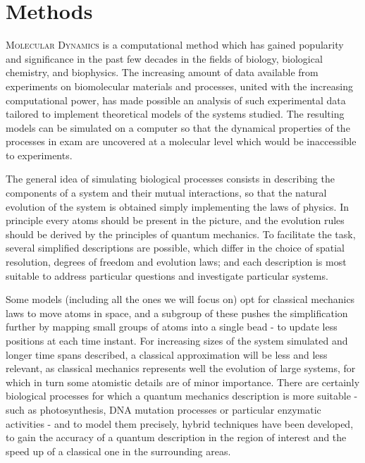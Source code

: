 \chapter{Methods} \label{chapter:MD}

\lettrine{M}{olecular Dynamics} is a computational method which has gained popularity and significance in the past few decades in the fields of biology, biological chemistry, and biophysics.
%
The increasing amount of data available from experiments on biomolecular materials and processes, united with the increasing computational power, has made possible an analysis of such experimental data tailored to implement theoretical models of the systems studied.
%
The resulting models can be simulated on a computer so that the dynamical properties of the processes in exam are uncovered at a molecular level which would be inaccessible to experiments.

The general idea of simulating biological processes consists in describing the components of a system and their mutual interactions, so that the natural evolution of the system is obtained simply implementing the laws of physics. In principle every atoms should be present in the picture, and the evolution rules should be derived by the principles of quantum mechanics.
%
To facilitate the task, several simplified descriptions are possible, which differ in the choice of spatial resolution, degrees of freedom and evolution laws; and each description is most suitable to address particular questions and investigate particular systems.

Some models (including all the ones we will focus on) opt for classical mechanics laws to move atoms in space, and a subgroup of these pushes the simplification further by mapping small groups of atoms into a single bead - to update less positions at each time instant.
%
For increasing sizes of the system simulated and longer time spans described, a classical approximation will be less and less relevant, as classical mechanics represents well the evolution of large systems, for which in turn some atomistic details are of minor importance.
%
There are certainly biological processes for which a quantum mechanics description is more suitable - such as photosynthesis, DNA mutation processes or particular enzymatic activities - and to model them precisely, hybrid techniques have been developed, to gain the accuracy of a quantum description in the region of interest and the speed up of a classical one in the surrounding areas.

